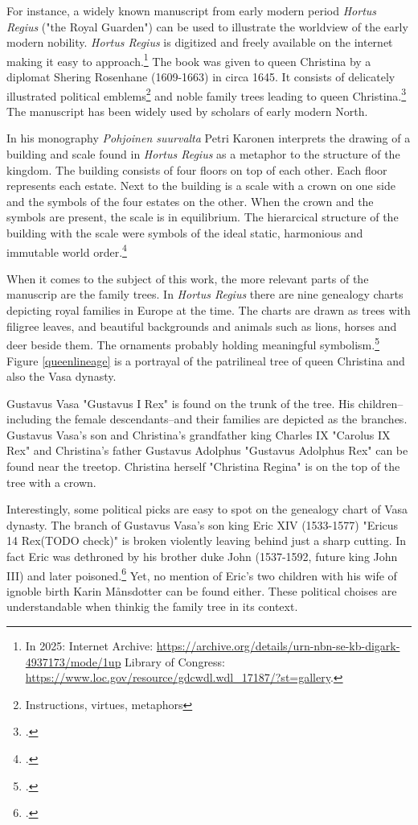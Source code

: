 For instance, a widely known manuscript from early modern period \textit{Hortus Regius} ("the Royal Guarden") can be used to illustrate the worldview of the early modern nobility. \textit{Hortus Regius} is digitized and freely available on the internet making it easy to approach.\footnote{In 2025: Internet Archive: \url{https://archive.org/details/urn-nbn-se-kb-digark-4937173/mode/1up} Library of Congress: \url{https://www.loc.gov/resource/gdcwdl.wdl\_17187/?st=gallery}.} The book was given to queen Christina by a diplomat Shering Rosenhane (1609-1663) in circa 1645. It consists of delicately illustrated political emblems\footnote{Instructions, virtues, metaphors} and noble family trees leading to queen Christina.\footcites{congresslibrary}[p. 271.]{BlennowAnna} The manuscript has been widely used by scholars of early modern North.

In his monography \textit{Pohjoinen suurvalta} Petri Karonen interprets the drawing of a building and scale found in \textit{Hortus Regius} as a metaphor to the structure of the kingdom. The building consists of four floors on top of each other. Each floor represents each estate. Next to the building is a scale with a crown on one side and the symbols of the four estates on the other. When the crown and the symbols are present, the scale is in equilibrium. The hierarcical structure of the building with the scale were symbols of the ideal static, harmonious and immutable world order.\footcite[p. 162-165.]{pSuurvalta}

When it comes to the subject of this work, the more relevant parts of the manuscrip are the family trees. In \textit{Hortus Regius} there are nine genealogy charts depicting royal families in Europe at the time. The charts are drawn as trees with filigree leaves, and beautiful backgrounds and animals such as lions, horses and deer beside them. The ornaments probably holding meaningful symbolism.\footcite{hortusregius} Figure \ref{queenlineage} is a portrayal of the patrilineal tree of queen Christina and also the Vasa dynasty.

Gustavus Vasa "Gustavus I Rex" is found on the trunk of the tree. His children–including the female descendants–and their families are depicted as the branches. Gustavus Vasa's son and Christina's grandfather king Charles IX "Carolus IX Rex" and Christina's father Gustavus Adolphus "Gustavus Adolphus Rex" can be found near the treetop. Christina herself "Christina Regina" is on the top of the tree with a crown. 

Interestingly, some political picks are easy to spot on the genealogy chart of Vasa dynasty. The branch of Gustavus Vasa's son king Eric XIV (1533-1577) "Ericus 14 Rex(TODO check)" is broken violently leaving behind just a sharp cutting. In fact Eric was dethroned by his brother duke John (1537-1592, future king John III) and later poisoned.\footcite[p. 118-124.]{MelinEtAl} Yet, no mention of Eric's two children with his wife of ignoble birth Karin Månsdotter can be found either. These political choises are understandable when thinkig the family tree in its context. 

